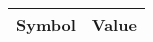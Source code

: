 \begin{tabular}{cl}
\hline
  Symbol  & Value                                                                                                                                                                                                                                                                                                                                                                                                                                                                                                                                                                                                                                                                                                                                                                                                                                                                                                                                                                                                                                                                                                                                                                                                                                                                                                                                                                                                                                                                                                                                                                                                                                                                                                                                                                                                                                                                                                                                                                                                                                                                                                                                                                                                                                                                            \\
\hline

\end{tabular}
